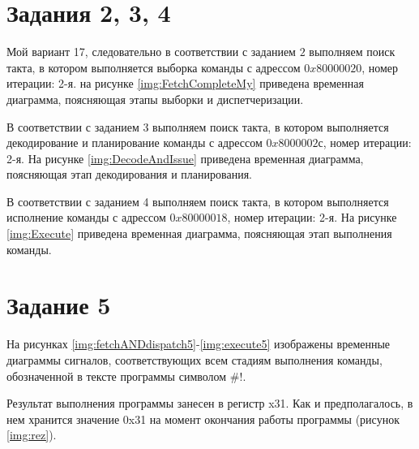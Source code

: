 \chapter{Задания 2, 3, 4}
\label{cha:impl}

Мой вариант 17, следовательно в соответствии с заданием $2$ выполняем поиск такта, в котором выполняется выборка команды с адрессом $0x80000020$, номер итерации: 2-я. на рисунке \ref{img:FetchCompleteMy} приведена временная диаграмма, поясняющая этапы выборки и диспетчеризации.


В соответствии с заданием 3 выполняем поиск такта, в котором выполняется декодирование и планирование команды с адрессом $0x8000002$с, номер итерации: 2-я. На рисунке \ref{img:DecodeAndIssue} приведена временная диаграмма, поясняющая этап декодирования и планирования.


В соответствии с заданием 4 выполняем поиск такта, в котором выполняется исполнение команды с адрессом $0x80000018$, номер итерации: 2-я. На рисунке \ref{img:Execute} приведена временная диаграмма, поясняющая этап выполнения команды.


\chapter{Задание 5}
На рисунках \ref{img:fetchANDdispatch5}-\ref{img:execute5} изображены временные диаграммы сигналов, соответствующих всем стадиям выполнения команды, обозначенной в тексте программы символом \#!.



\newpage
{}

Результат выполнения программы занесен в регистр x31. Как и предполагалось, в нем хранится значение 0x31 на момент окончания работы программы (рисунок \ref{img:rez}).

